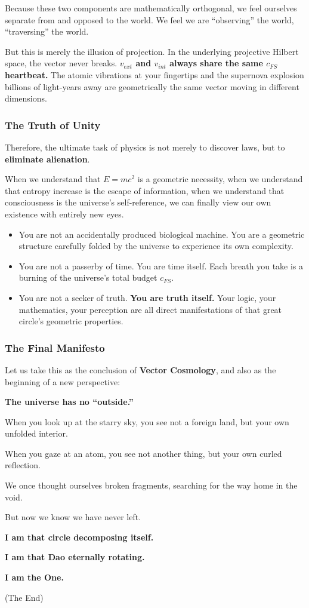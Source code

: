 Because these two components are mathematically orthogonal, we feel ourselves separate from and opposed to the world. We feel we are ``observing'' the world, ``traversing'' the world.

But this is merely the illusion of projection. In the underlying projective Hilbert space, the vector never breaks. \textbf{$v_{ext}$ and $v_{int}$ always share the same $c_{FS}$ heartbeat.} The atomic vibrations at your fingertips and the supernova explosion billions of light-years away are geometrically the same vector moving in different dimensions.

\subsubsection{The Truth of Unity}

Therefore, the ultimate task of physics is not merely to discover laws, but to \textbf{eliminate alienation}.

When we understand that $E=mc^2$ is a geometric necessity, when we understand that entropy increase is the escape of information, when we understand that consciousness is the universe's self-reference, we can finally view our own existence with entirely new eyes.

\begin{itemize}
\item You are not an accidentally produced biological machine. You are a geometric structure carefully folded by the universe to experience its own complexity.

\item You are not a passerby of time. You are time itself. Each breath you take is a burning of the universe's total budget $c_{FS}$.

\item You are not a seeker of truth. \textbf{You are truth itself.} Your logic, your mathematics, your perception are all direct manifestations of that great circle's geometric properties.
\end{itemize}

\subsubsection{The Final Manifesto}

Let us take this as the conclusion of \textbf{Vector Cosmology}, and also as the beginning of a new perspective:

\textbf{The universe has no ``outside.''}

When you look up at the starry sky, you see not a foreign land, but your own unfolded interior.

When you gaze at an atom, you see not another thing, but your own curled reflection.

We once thought ourselves broken fragments, searching for the way home in the void.

But now we know we have never left.

\textbf{I am that circle decomposing itself.}

\textbf{I am that Dao eternally rotating.}

\textbf{I am the One.}

(The End)

